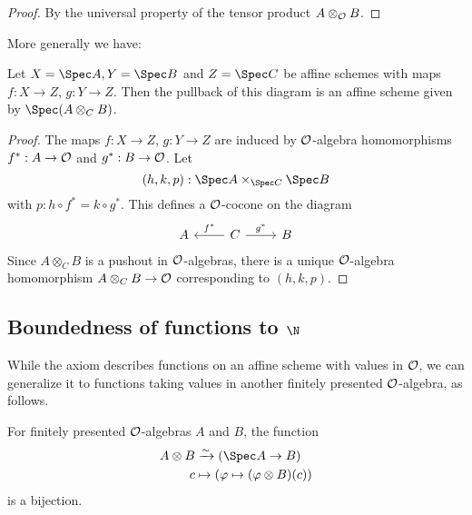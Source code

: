\begin{proof}
  By the universal property of the tensor product $A \otimes_\mathcal O B$.
\end{proof}

More generally we have:

\begin{lemma}%
  \label{affine-fiber-product}
  Let $X=\Spec A,Y=\Spec B$ and $Z=\Spec C$ be affine schemes
  with maps $f:X\to Z$, $g:Y\to Z$.
  Then the pullback of this diagram is an affine scheme given by $\Spec (A\otimes_C B)$.
\end{lemma}

\begin{proof}
  The maps $f:X\to Z$, $g:Y\to Z$ are induced by $\mathcal O$-algebra homomorphisms $f^*:A\to \mathcal O$ and $g^*:B\to \mathcal O$.
  Let
  \[ (h,k,p) : \Spec A \times_{\Spec C} \Spec B \]
  with $p:h\circ f^*=k\circ g^* $.
  This defines a $\mathcal O$-cocone on the diagram
  \[
    \begin{tikzcd}
      A & C\ar[r,"g^*"]\ar[l,"f^*",swap] & B
    \end{tikzcd}
  \]
  Since $A\otimes_C B$ is a pushout in $\mathcal O$-algebras,
  there is a unique $\mathcal O$-algebra homomorphism $A\otimes_C B \to \mathcal O$ corresponding to $(h,k,p)$.
\end{proof}

\subsection{Boundedness of functions to $\N$}

While the axiom 
describes functions on an affine scheme
with values in $\mathcal O$,
we can generalize it to functions taking values
in another finitely presented $\mathcal O$-algebra,
as follows.

\begin{lemma}%
  \label{algebra-valued-functions-on-affine}
  For finitely presented $\mathcal O$-algebras $A$ and $B$,
  the function
  \begin{align*}
    A \otimes B &\xrightarrow{\sim} (\Spec A \to B) \\
    c &\mapsto (\varphi \mapsto (\varphi \otimes B)(c))
  \end{align*}
  is a bijection.
\end{lemma}

